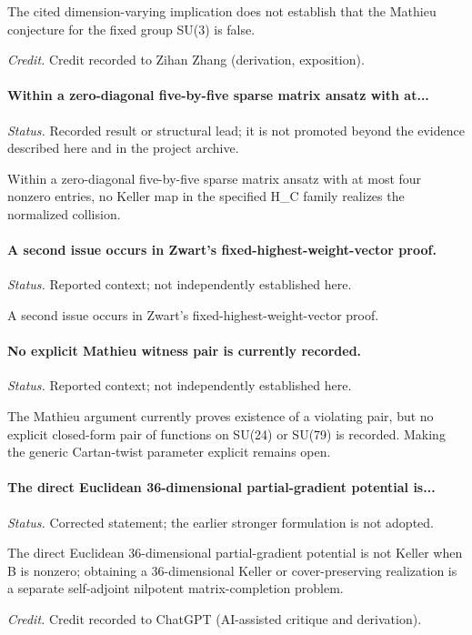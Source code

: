 The cited dimension-varying implication does not establish that the Mathieu conjecture for the fixed group SU(3) is false.

\emph{Credit.} Credit recorded to Zihan Zhang (derivation, exposition).

\label{supp-note-05-039}
\paragraph{Within a zero-diagonal five-by-five sparse matrix ansatz with at...}
\emph{Status.} Recorded result or structural lead; it is not promoted beyond the evidence described here and in the project archive.

Within a zero-diagonal five-by-five sparse matrix ansatz with at most four nonzero entries, no Keller map in the specified H\_C family realizes the normalized collision.

\label{supp-note-05-040}
\paragraph{A second issue occurs in Zwart's fixed-highest-weight-vector proof.}
\emph{Status.} Reported context; not independently established here.

A second issue occurs in Zwart's fixed-highest-weight-vector proof.

\label{supp-note-05-041}
\paragraph{No explicit Mathieu witness pair is currently recorded.}
\emph{Status.} Reported context; not independently established here.

The Mathieu argument currently proves existence of a violating pair, but no explicit closed-form pair of functions on SU(24) or SU(79) is recorded.  Making the generic Cartan-twist parameter explicit remains open.

\label{supp-note-05-042}
\paragraph{The direct Euclidean 36-dimensional partial-gradient potential is...}
\emph{Status.} Corrected statement; the earlier stronger formulation is not adopted.

The direct Euclidean 36-dimensional partial-gradient potential is not Keller when B is nonzero; obtaining a 36-dimensional Keller or cover-preserving realization is a separate self-adjoint nilpotent matrix-completion problem.

\emph{Credit.} Credit recorded to ChatGPT (AI-assisted critique and derivation).

\endgroup
